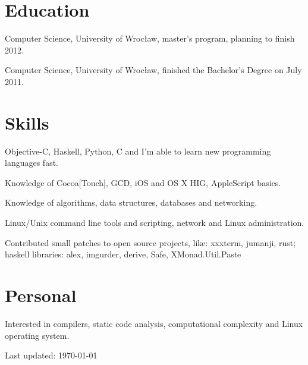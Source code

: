 \documentclass[letterpaper]{article}
\def\footerlink{}
\renewenvironment{itemize}{
  \begin{list}{}{
    \setlength{\leftmargin}{1.5em}
  }
}{
  \end{list}
}
\begin{document}
\section*{Education}

\begin{itemize}
  	\item Computer Science, University of Wrocław, master's program, planning to finish 2012.
  	\item Computer Science, University of Wrocław, finished the Bachelor's Degree on July 2011.
\end{itemize}

\section*{Skills}
\begin{itemize}
	\item Objective-C, Haskell, Python, C and I'm able to learn new programming languages fast.
	\item Knowledge of Cocoa[Touch], GCD, iOS and OS X HIG, AppleScript basics.
	\item Knowledge of algorithms, data structures, databases and networking.
	\item Linux/Unix command line tools and scripting, network and Linux administration.
	\item Contributed small patches to open source projects, like: xxxterm, jumanji, rust;\\
		 haskell libraries: alex, imgurder, derive, Safe, XMonad.Util.Paste
\end{itemize}

\section*{Personal}

\begin{itemize}
	\item Interested in compilers, static code analysis, computational complexity and Linux operating system.
\end{itemize}

\bigskip

\begin{center}
  \begin{footnotesize}
    Last updated: \today \\
    \href{\footerlink}{\texttt{\footerlink}}
  \end{footnotesize}
\end{center}
\end{document}
